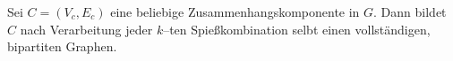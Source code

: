 \begin{comment}
\begin{lemma}\label{lem:neue-komponenten}
Sei $C = (V_c, E_c) \subseteq G$ eine Zusammenhangskomponente.
Sei $K = (F, Z)$ eine Spießkombiantion.
Wir betrachten, was mit $G$ nach der Verarbeitung von $K$ passiert.
\begin{enumerate}[label={\upshape(\roman*)}]
  \item Falls gilt: $F \cup Z = V_c$, dann entsteht keine neue Zusammenhangskomponente in $G$. \label{lem:neue-komponenten1}
  \item Falls gilt: $F \cup Z \subsetneq V_c$,%
  dann entstehen zwei neue Zusammenhangskomponenten in $G$ --- $C$ wird in zwei Komponenten gespalten.\label{lem:neue-komponenten2}
  \item Seien $C_1, C_2, ..., C_k \subset G$ voneinander unterschiedliche Zusammenhangskomponenten.\\
  Falls $F \cup Z$ aus mehreren Teilmengen aus $C_1, C_2, ..., C_k$ besteht, gelten für jede Komponente $C_i$ ebenfalls \ref{lem:neue-komponenten1} und \ref{lem:neue-komponenten2}.
\end{enumerate}

\end{lemma}

\begin{proof}
\TODO{was machen wir mit dem Beweis?}
Die Beweise für die entsprechenden Punkte:
\begin{enumerate}[label={\upshape(\roman*)}]
  \item Nach der Definition einer Zusammenhangskomponente gilt: $\nexists x \in V_c: x \in V \setminus V_c$.
  Bei Bearbeiteung von $K$ werden nach Lemma \ref{lem:spiess-numbers} alle Kanten zwischen 
  $x \in V \setminus V_c$ und $y \in V_c$ aus $E$ entfernt.
  Deshalb werden bei so einer Spießkombination $K$ keine Kanten entfernt.
  \item blablabla
\end{enumerate}
\end{proof}
\end{comment}

\begin{lemma}\label{lem:komponente-complete}
Sei $C = (V_c, E_c)$ eine beliebige Zusammenhangskomponente in $G$. 
Dann bildet $C$ nach Verarbeitung jeder $k$--ten Spießkombination
selbt einen vollständigen, bipartiten Graphen.
\end{lemma}

